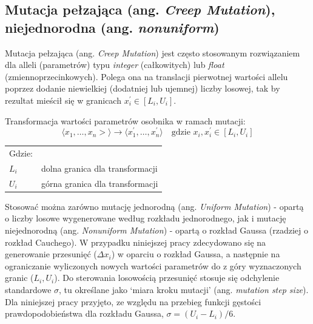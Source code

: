 \documentclass[a4paper,11pt]{article}
\begin{document}
    \subsection{Mutacja pełzająca (ang. \textit{Creep Mutation}), niejednorodna (ang. \textit{nonuniform})}

    Mutacja pełzająca (ang. \textit{Creep Mutation}) jest często stosowanym rozwiązaniem dla alleli (parametrów) typu \textit{integer} (całkowitych) lub \textit{float} (zmiennoprzecinkowych). Polega ona na translacji pierwotnej wartości allelu poprzez dodanie niewielkiej (dodatniej lub ujemnej) liczby losowej, tak by rezultat mieścił się w granicach $x_{i}^{'} \in [L_{i}, U_{i}]$\cite{IntroductionToEvolutionaryComputing2015}.

    \bigskip

    \noindent
    \begin{minipage}[H]{\textwidth}
        \setlength\parindent{17pt} Transformacja wartości parametrów osobnika w ramach mutacji: \\
        \begin{equation}
            \label{eq:mutation_transformation}
            \langle x_{1},\dotsc,x_{n}> \rangle \to \langle x_{1}^{'},\dotsc,x_{n}^{'} \rangle \quad \text{gdzie } x_{i}, x_{i}^{'} \in [L_{i}, U_{i}]
        \end{equation}
        \smallskip
        \begin{tabular}{p{}p{}}
            Gdzie: \\
            $L_{i}$ & dolna granica dla transformacji \\
            $U_{i}$ & górna granica dla transformacji \\
        \end{tabular}
    \end{minipage}

    \bigskip

    Stosować można zarówno mutację jednorodną (ang. \textit{Uniform Mutation}) - opartą o liczby losowe wygenerowane według rozkładu jednorodnego, jak i mutację niejednorodną (ang. \textit{Nonuniform Mutation}) - opartą o rozkład Gaussa (rzadziej o rozkład Cauchego)\cite{IntroductionToEvolutionaryComputing2015}. W przypadku niniejszej pracy zdecydowano się na generowanie przesunięć ($\Delta x_{i}$) w oparciu o rozkład Gaussa, a następnie na ograniczanie wyliczonych nowych wartości parametrów do z góry wyznaczonych granic ($L_{i}, U_{i}$). Do sterowania losowością przesunięć stosuje się odchylenie standardowe $\sigma$, tu określane jako `miara kroku mutacji' (ang. \textit{mutation step size}). Dla niniejszej pracy przyjęto, ze względu na przebieg funkcji gęstości prawdopodobieństwa dla rozkładu Gaussa, $\sigma = (U_{i} - L_{i}) / 6$.
\end{document}
